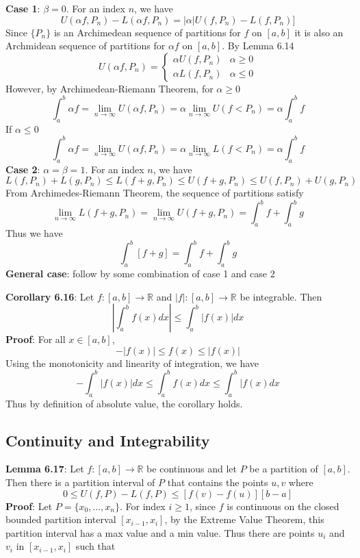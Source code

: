 \documentclass{article}
\begin{document}
    \textbf{Case 1}: $\beta = 0$. For an index $n$, we have
    \[U(\alpha f, P_n) - L(\alpha f, P_n) = |\alpha|U(f, P_n) - L(f, P_n)]\]
    Since $\{P_n\}$ is an Archimedean sequence of partitions for $f$ on $[a, b]$ it is also an Archmidean sequence of partitions for $\alpha f$ on $[a, b]$. By Lemma 6.14
    \[U(\alpha f, P_n) = \begin{cases} \alpha U(f, P_n) & \alpha \geq 0 \\ \alpha L(f, P_n) & \alpha \leq 0 \end{cases}\]
    However, by Archimedean-Riemann Theorem, for $\alpha \geq 0$
    \[\int_a^b \alpha f = \lim_{n \rightarrow \infty}U(\alpha f, P_n) = \alpha \lim_{n \rightarrow \infty} U(f< P_n) = \alpha \int_a^b f\]
    If $\alpha \leq 0$
    \[\int_a^b \alpha f = \lim_{n \rightarrow \infty}U(\alpha f, P_n) = \alpha \lim_{n \rightarrow \infty} L(f< P_n) = \alpha \int_a^b f\]
    \textbf{Case 2}: $\alpha = \beta = 1$. For an index $n$, we have
    \[L(f, P_n) + L(g, P_n) \leq L(f + g, P_n) \leq U(f + g, P_n) \leq U(f, P_n) + U(g, P_n)\]
    From Archimedes-Riemann Theorem, the sequence of partitions satisfy
    \[\lim_{n \rightarrow \infty} L(f + g, P_n) = \lim_{n \rightarrow \infty} U(f + g, P_n) = \int_a^b f + \int_a^b g\]
    Thus we have
    \[\int_a^b [f + g] = \int_a^b f + \int_a^b g\]
    \textbf{General case}: follow by some combination of case 1 and case 2 \bigskip

    \textbf{Corollary 6.16}: Let $f \colon [a, b] \rightarrow \mathbb{R}$ and $|f| \colon [a,b] \rightarrow \mathbb{R}$ be integrable. Then
      \[\left|\int_a^b f (x) dx \right| \leq \int_a^b |f(x)| dx\]
      \textbf{Proof}: For all $x \in [a, b]$,
      \[-|f(x)| \leq f(x) \leq |f(x)|\]
      Using the monotonicity and linearity of integration, we have
      \[-\int_a^b |f(x)| dx \leq \int_a^b f(x)dx \leq \int_a^b |f(x) dx\]
      Thus by definition of absolute value, the corollary holds.
    \subsection{Continuity and Integrability}
    \textbf{Lemma 6.17}: Let $f \colon [a,b] \rightarrow \mathbb{R}$ be continuous and let $P$ be a partition of $[a,b]$. Then there is a partition interval of $P$ that contains the points $u,v$ where
    \[0 \leq U(f, P) - L(f, P) \leq [f(v) - f(u)][b-a]\]
    \textbf{Proof}: Let $P = \{x_0, \ldots, x_n\}$. For index $i \geq 1$, since $f$ is continuous on the closed bounded partition interval $[x_{i-1}, x_i]$, by the Extreme Value Theorem, this partition interval has a max value and a min value. Thus there are points $u_i$ and $v_i$ in $[x_{i-1}, x_i]$ such that
\end{document}
